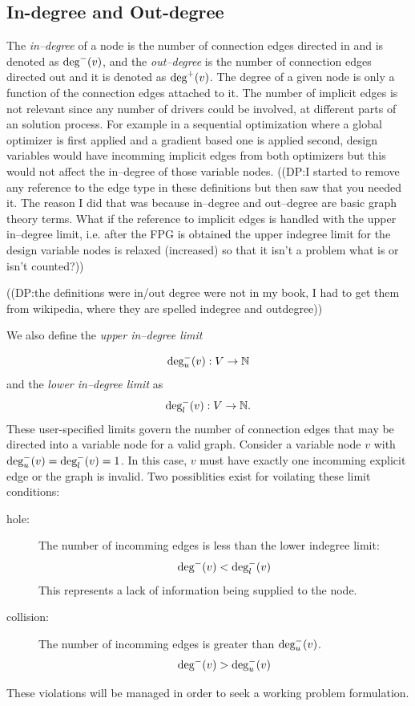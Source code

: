 \subsection{In-degree and Out-degree}
	\label{s:indegree-outdegree}
	The \emph{in--degree} of a node is the number of connection edges directed in and 
	is denoted as $\textrm{deg}^-(v)$, and the \emph{out--degree} 
	is the number of connection edges directed out and it is denoted as $\textrm{deg}^+(v)$.
	The degree of a given node is only a function of the connection edges 
	attached to it. The number of implicit edges is not relevant since any number 
	of drivers could be involved, at different parts of an solution process. For 
	example in a sequential optimization where a global optimizer is first applied
	and a gradient based one is applied second, design variables would have incomming 
	implicit edges from both optimizers but this would not affect the in--degree of those
	variable nodes. 
	((DP:I started to remove any reference to the edge type in these definitions but then saw that you needed it. The reason I did that was because in--degree and out--degree are basic graph theory terms. What if the reference to implicit edges is handled with the upper in--degree limit, i.e. after the FPG is obtained the upper indegree limit for the design variable nodes is relaxed (increased) so that it isn't a problem what is or isn't counted?))

	((DP:the definitions were in/out degree were not in my book, I had to get them from wikipedia, where they are spelled indegree and outdegree))

	We also define the \emph{upper in--degree limit} 

	\begin{equation}
	\textrm{deg}_u^-(v):V \to \mathbb{N}
	\end{equation} 
	and the \emph{lower in--degree limit} as
	\begin{equation}
	\textrm{deg}_l^-(v):V \to \mathbb{N}.
	\end{equation}
	These user-specified limits govern the number of connection edges that may be directed into a variable
	node for a valid graph. Consider a variable node $v$ with
	$\textrm{deg}_u^-(v) = \textrm{deg}_l^-(v) = 1$. In this case, $v$ must have exactly one
	incomming explicit edge or the graph is invalid. Two possiblities exist for voilating 
	these limit conditions: 
	\begin{description}
	  \item[hole: ] The number of incomming edges is less than the lower indegree limit:
		\begin{equation} \textrm{deg}^-(v) < \textrm{deg}_l^-(v) \label{e:hole} \end{equation}
		This represents a lack of information being supplied to the node.

  \item[collision: ] The number of incomming edges is greater than $ \textrm{deg}_u^-(v)$. 
    \begin{equation} \textrm{deg}^-(v) > \textrm{deg}_u^-(v) \end{equation}
\end{description} 
These violations will be managed in order to seek a working problem formulation.

